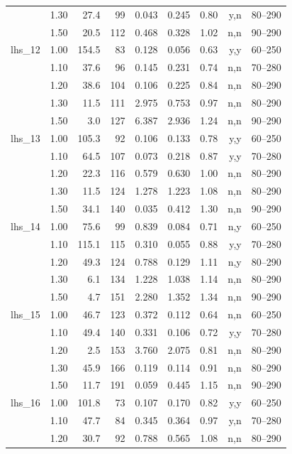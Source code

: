 \begin{longtable}{@{}l r r r r r r r r@{}}
 & 1.30 & 27.4 & 99 & 0.043 & 0.245 & 0.80 & y,n & 80--290 \\
 & 1.50 & 20.5 & 112 & 0.468 & 0.328 & 1.02 & n,n & 90--290 \\
\addlinespace
lhs\_12 & 1.00 & 154.5 & 83 & 0.128 & 0.056 & 0.63 & y,y & 60--250 \\
 & 1.10 & 37.6 & 96 & 0.145 & 0.231 & 0.74 & n,n & 70--280 \\
 & 1.20 & 38.6 & 104 & 0.106 & 0.225 & 0.84 & n,n & 80--290 \\
 & 1.30 & 11.5 & 111 & 2.975 & 0.753 & 0.97 & n,n & 80--290 \\
 & 1.50 & 3.0 & 127 & 6.387 & 2.936 & 1.24 & n,n & 90--290 \\
\addlinespace
lhs\_13 & 1.00 & 105.3 & 92 & 0.106 & 0.133 & 0.78 & y,y & 60--250 \\
 & 1.10 & 64.5 & 107 & 0.073 & 0.218 & 0.87 & y,y & 70--280 \\
 & 1.20 & 22.3 & 116 & 0.579 & 0.630 & 1.00 & n,n & 80--290 \\
 & 1.30 & 11.5 & 124 & 1.278 & 1.223 & 1.08 & n,n & 80--290 \\
 & 1.50 & 34.1 & 140 & 0.035 & 0.412 & 1.30 & n,n & 90--290 \\
\addlinespace
lhs\_14 & 1.00 & 75.6 & 99 & 0.839 & 0.084 & 0.71 & n,y & 60--250 \\
 & 1.10 & 115.1 & 115 & 0.310 & 0.055 & 0.88 & y,y & 70--280 \\
 & 1.20 & 49.3 & 124 & 0.788 & 0.129 & 1.11 & n,y & 80--290 \\
 & 1.30 & 6.1 & 134 & 1.228 & 1.038 & 1.14 & n,n & 80--290 \\
 & 1.50 & 4.7 & 151 & 2.280 & 1.352 & 1.34 & n,n & 90--290 \\
\addlinespace
lhs\_15 & 1.00 & 46.7 & 123 & 0.372 & 0.112 & 0.64 & n,n & 60--250 \\
 & 1.10 & 49.4 & 140 & 0.331 & 0.106 & 0.72 & y,y & 70--280 \\
 & 1.20 & 2.5 & 153 & 3.760 & 2.075 & 0.81 & n,n & 80--290 \\
 & 1.30 & 45.9 & 166 & 0.119 & 0.114 & 0.91 & n,n & 80--290 \\
 & 1.50 & 11.7 & 191 & 0.059 & 0.445 & 1.15 & n,n & 90--290 \\
\addlinespace
lhs\_16 & 1.00 & 101.8 & 73 & 0.107 & 0.170 & 0.82 & y,y & 60--250 \\
 & 1.10 & 47.7 & 84 & 0.345 & 0.364 & 0.97 & y,n & 70--280 \\
 & 1.20 & 30.7 & 92 & 0.788 & 0.565 & 1.08 & n,n & 80--290 \\

\end{longtable}
